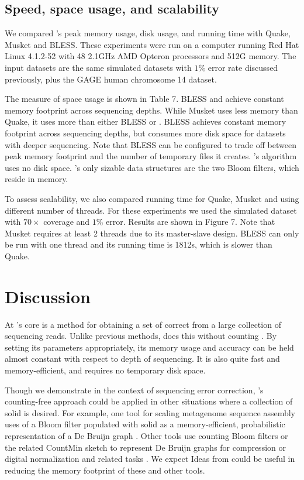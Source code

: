 \documentclass{bmcart}
\begin{document}
\subsection*{Speed, space usage, and scalability}

We compared \tool's peak memory usage, disk usage, and running time with Quake, Musket and BLESS.  These experiments were run on a computer running Red Hat Linux 4.1.2-52 with 48 2.1GHz AMD Opteron processors and 512G memory.
The input datasets are the same simulated \ecoli datasets with $1\%$ error rate discussed previously, plus the GAGE human chromosome 14 dataset.

The measure of space usage is shown in Table 7. BLESS and \tool achieve constant memory footprint across sequencing depths.  While Musket uses less memory than Quake, it uses more than either BLESS or \tool.  BLESS achieves constant memory footprint across sequencing depths, but consumes more disk space for datasets with deeper sequencing.  Note that BLESS can be configured to trade off between peak memory footprint and the number of temporary files it creates.  \tool's algorithm uses no disk space.  \tool's only sizable data structures are the two Bloom filters, which reside in memory.

To assess scalability, we also compared running time for Quake, Musket and \tool using different number of threads.  For these experiments we used the simulated \ecoli dataset with $70\times$ coverage and $1\%$ error.  Results are shown in Figure 7.  Note that Musket requires at least 2 threads due to its master-slave design.  BLESS can only be run with one thread and its running time is 1812s, which is slower than Quake.


\section*{Discussion}
At \tool's core is a method for obtaining a set of correct \kmers from a large collection of sequencing reads.
Unlike previous methods, \tool does this without counting \kmers.
By setting its parameters appropriately, its memory usage and accuracy can be held almost constant with respect to depth of sequencing.
It is also quite fast and memory-efficient, and requires no temporary disk space.

Though we demonstrate \tool in the context of sequencing error correction, \tool's counting-free approach could be applied in other situations where a collection of solid \kmers is desired.
For example, one tool for scaling metagenome sequence assembly uses of a Bloom filter populated with solid \kmers as a memory-efficient, probabilistic representation of a De Bruijn graph \cite{pell2012scaling}.
Other tools use counting Bloom filters \cite{fan2000summary, bonomi2006improved} or the related CountMin sketch \cite{cormode2005improved} to represent De Bruijn graphs for compression \cite{jones2012compression} or digital normalization and related tasks \cite{zhang2013these}.
We expect Ideas from \tool could be useful in reducing the memory footprint of these and other tools.
\end{document}
